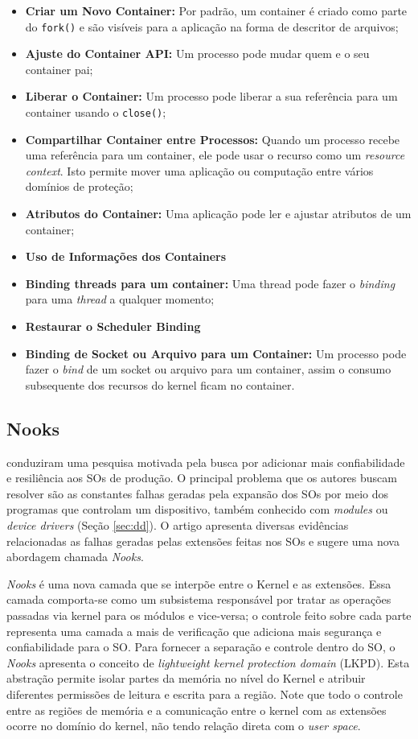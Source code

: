 \begin{itemize}
	\item \textbf{Criar um Novo Container:} Por padrão, um container é criado
				como parte do \texttt{fork()} e são visíveis para a aplicação na forma
				de descritor de arquivos;
	\item \textbf{Ajuste do Container API:} Um processo pode mudar quem e o seu
				container pai;
	\item \textbf{Liberar o Container:} Um processo pode liberar a sua referência
				para um container usando o \texttt{close()};
	\item \textbf{Compartilhar Container entre Processos:} Quando um processo
				recebe uma referência para um container, ele pode usar o recurso como
				um \emph{resource context}. Isto permite mover uma aplicação ou
				computação entre vários domínios de proteção;
	\item \textbf{Atributos do Container:} Uma aplicação pode ler e ajustar
				atributos de um container;
	\item \textbf{Uso de Informações dos Containers}
	\item \textbf{Binding threads para um container:} Uma thread pode fazer o
				\emph{binding} para uma \emph{thread} a qualquer momento;
	\item \textbf{Restaurar o Scheduler Binding}
	\item \textbf{Binding de Socket ou Arquivo para um Container:} Um processo
				pode fazer o \emph{bind} de um socket ou arquivo para um container,
				assim o consumo subsequente dos recursos do kernel ficam no container.
\end{itemize}

\subsection{Nooks}
\cite{nooks} conduziram uma pesquisa motivada pela busca por
adicionar mais confiabilidade e resiliência aos SOs de produção. O principal
problema que os autores buscam resolver são as constantes falhas geradas pela
expansão dos SOs por meio dos programas que controlam um dispositivo, também
conhecido com \emph{modules} ou \emph{device drivers} (Seção \ref{sec:dd}). O
artigo apresenta diversas evidências relacionadas as falhas geradas
pelas extensões feitas nos SOs e sugere uma nova abordagem chamada
\emph{Nooks}.

\emph{Nooks} é uma nova camada que se interpõe entre o Kernel e as extensões.
Essa camada comporta-se como um subsistema responsável por tratar as operações
passadas via kernel para os módulos e vice-versa; o controle feito sobre cada
parte representa uma camada a mais de verificação que adiciona mais segurança e
confiabilidade para o SO. Para fornecer a separação e controle dentro do SO, o
\emph{Nooks} apresenta o conceito de \emph{lightweight kernel protection
domain} (LKPD). Esta abstração permite isolar partes da memória no nível do
Kernel e atribuir diferentes permissões de leitura e escrita para a região.
Note que todo o controle entre as regiões de memória e a comunicação entre o
kernel com as extensões ocorre no domínio do kernel, não tendo relação direta
com o \emph{user space}.

